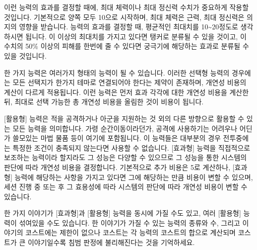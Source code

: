 \documentclass{report}
\begin{document}
	이런 능력의 효과를 결정할 때에, 최대 체력이나 최대 정신력 수치가 중요하게 작용할 것입니다. 기본적으로 양쪽 모두 10으로 시작하며, 최대 체력은 근력, 최대 정신력은 의지의 영향을 받습니다. 능력의 효과를 결정할 때, 평균적인 최대치를 10\textasciitilde20정도로 생각하시면 됩니다. 이 이상의 최대치를 가지고 있다면 탱커로 분류될 수 있을 것이고, 이 수치의 50\% 이상의 피해를 한번에 줄 수 있다면 궁극기에 해당하는 효과로 분류될 수 있을 것입니다.
	
	한 가지 능력은 여러가지 형태의 능력이 될 수 있습니다. 이러한 선택형 능력의 경우에는 모든 선택지가 한가지 테마로 연결되어야 한다는 제약이 존재하며, 개연성 비용의 계산이 다르게 적용됩니다. 이런 능력은 먼저 효과 각각에 대한 개연성 비용을 계산한 뒤, 최대로 선택 가능한 총 개연성 비용을 올림한 것이 비용이 됩니다.
	
	[활용형] 능력은 적을 공격하거나 아군을 지원하는 것 외의 다른 방향으로 활용할 수 있는 모든 능력을 의미합니다. 가령 순간이동이라던가, 공격에 사용하기는 어려우나 어딘가 쓸모있는 마법 물품 등이 여기에 포함됩니다. 이 능력들은 대부분의 경우 전투중에는 특정한 조건이 충족되지 않는다면 사용할 수 없습니다. [효과형] 능력을 직접적으로 보조하는 능력이라 할지라도 그 성능은 다양할 수 있으므로 그 성능을 통한 시스템의 판단에 따라 개연성 비용을 결정합니다. 기본적으로 추가 비용은 5로 계산하나, [효과형] 능력에 해당하는 사항을 가지고 있다면 그에 해당하는 만큼 비용이 변할 수 있으며, 세션 진행 중 또는 후 그 효용성에 따라 시스템의 판단에 따라 개연성 비용이 변할 수 있습니다.
	
	한 가지 이야기가 [효과형]과 [활용형] 능력을 동시에 가질 수도 있고, 여러 [활용형] 능력이 섞여있을 수도 있습니다. 한 이야기가 가질 수 있는 능력의 종류와 수, 그리고 이야기의 코스트에는 제한이 없으나 코스트는 각 능력의 코스트의 합으로 계산되며 코스트가 큰 이야기일수록 침범 판정에 불리해진다는 것을 기억하세요.
	
	\bigskip
	
\end{document}
